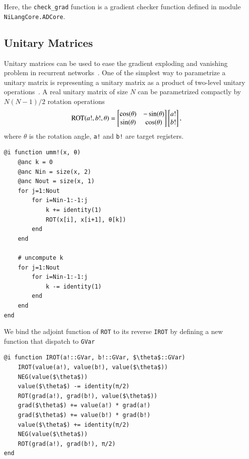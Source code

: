 \documentclass[aps,twocolumn,longbibliography,english,superscriptaddress,prr]{revtex4-1}
\newcommand{\<}{\langle}
\renewcommand{\>}{\rangle}
\theoremstyle{definition}\newtheorem{definition}{\textit{Definition}}
\begin{document}
Here, the \texttt{check\_grad} function is a gradient checker function defined in module \texttt{NiLangCore.ADCore}.

\subsection{Unitary Matrices}\label{sec:umm}
Unitary matrices can be used to ease the gradient exploding and vanishing problem in recurrent networks~\cite{Arjovsky2015,Wisdom2016,Li2016}.
One of the simplest way to parametrize a unitary matrix is representing a unitary matrix as a product of two-level unitary operations~\cite{Li2016}. A real unitary matrix of size $N$ can be parametrized compactly by $N(N-1)/2$ rotation operations~\cite{Li2013}
\begin{align}
    {\rm ROT}(a!, b!, \theta)  = \begin{bmatrix}
        \cos(\theta) & - \sin(\theta)\\
        \sin(\theta)  & \cos(\theta)
    \end{bmatrix}
    \begin{bmatrix}
        a!\\
        b!
    \end{bmatrix},
\end{align}
where \texttt{$\theta$} is the rotation angle, \texttt{a!} and \texttt{b!} are target registers.

\begin{minipage}{.44\textwidth}
\begin{lstlisting}
@i function umm!(x, θ)
    @anc k = 0
    @anc Nin = size(x, 2)
    @anc Nout = size(x, 1)
    for j=1:Nout
        for i=Nin-1:-1:j
            k += identity(1)
            ROT(x[i], x[i+1], θ[k])
        end
    end

    # uncompute k
    for j=1:Nout
        for i=Nin-1:-1:j
            k -= identity(1)
        end
    end
end
\end{lstlisting}
\end{minipage}

We bind the adjoint function of \texttt{ROT} to its reverse \texttt{IROT} by defining a new function that dispatch to \texttt{GVar}

\begin{minipage}{.44\textwidth}
    \begin{lstlisting}[mathescape=true]
@i function IROT(a!::GVar, b!::GVar, $\theta$::GVar)
    IROT(value(a!), value(b!), value($\theta$))
    NEG(value($\theta$))
    value($\theta$) -= identity(π/2)
    ROT(grad(a!), grad(b!), value($\theta$))
    grad($\theta$) += value(a!) * grad(a!)
    grad($\theta$) += value(b!) * grad(b!)
    value($\theta$) += identity(π/2)
    NEG(value($\theta$))
    ROT(grad(a!), grad(b!), π/2)
end
\end{lstlisting}
\end{minipage}
\end{document}
